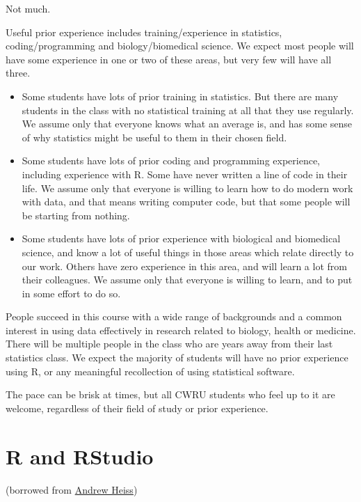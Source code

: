 \documentclass[
]{book}
\providecommand{\tightlist}{%
  \setlength{\itemsep}{0pt}\setlength{\parskip}{0pt}}
\begin{document}
Not much.

Useful prior experience includes training/experience in statistics, coding/programming and biology/biomedical science. We expect most people will have some experience in one or two of these areas, but very few will have all three.

\begin{itemize}
\tightlist
\item
  Some students have lots of prior training in statistics. But there are many students in the class with no statistical training at all that they use regularly. We assume only that everyone knows what an average is, and has some sense of why statistics might be useful to them in their chosen field.\\
\item
  Some students have lots of prior coding and programming experience, including experience with R. Some have never written a line of code in their life. We assume only that everyone is willing to learn how to do modern work with data, and that means writing computer code, but that some people will be starting from nothing.
\item
  Some students have lots of prior experience with biological and biomedical science, and know a lot of useful things in those areas which relate directly to our work. Others have zero experience in this area, and will learn a lot from their colleagues. We assume only that everyone is willing to learn, and to put in some effort to do so.
\end{itemize}

People succeed in this course with a wide range of backgrounds and a common interest in using data effectively in research related to biology, health or medicine. There will be multiple people in the class who are years away from their last statistics class. We expect the majority of students will have no prior experience using R, or any meaningful recollection of using statistical software.

The pace can be brisk at times, but all CWRU students who feel up to it are welcome, regardless of their field of study or prior experience.

\hypertarget{r-and-rstudio-1}{%
\section{R and RStudio}\label{r-and-rstudio-1}}

(borrowed from \href{https://evalf19.classes.andrewheiss.com/syllabus/}{Andrew Heiss})
\end{document}
